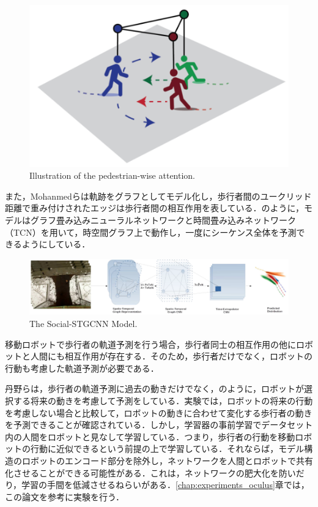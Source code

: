 \begin{figure}[hbtp]
     \centering
    \includegraphics[keepaspectratio, scale=0.4]
         {images/s-bigat.png}
    \caption{Illustration of the pedestrian-wise attention.\protect\footnotemark[3]}
    \label{Fig:s-bigat}
\end{figure}

\protect{}

また，Mohanmedら\cite{s-stgcnn}は軌跡をグラフとしてモデル化し，歩行者間のユークリッド距離で重み付けされたエッジは歩行者間の相互作用を表している．のように，モデルはグラフ畳み込みニューラルネットワークと時間畳み込みネットワーク（TCN）を用いて，時空間グラフ上で動作し，一度にシーケンス全体を予測できるようにしている．

\begin{figure}[hbtp]
     \centering
    \includegraphics[keepaspectratio, scale=0.39]
         {images/s-stgcnn.png}
    \caption{The Social-STGCNN Model.\protect\footnotemark[4]}
    \label{Fig:s-stgcnn}
\end{figure}

\protect{}

\newpage

移動ロボットで歩行者の軌道予測を行う場合，歩行者同士の相互作用の他にロボットと人間にも相互作用が存在する．そのため，歩行者だけでなく，ロボットの行動も考慮した軌道予測が必要である．

丹野ら\cite{si2023-tanno}は，歩行者の軌道予測に過去の動きだけでなく，のように，ロボットが選択する将来の動きを考慮して予測をしている．実験では，ロボットの将来の行動を考慮しない場合と比較して，ロボットの動きに合わせて変化する歩行者の動きを予測できることが確認されている．しかし，学習器の事前学習でデータセット内の人間をロボットと見なして学習している．つまり，歩行者の行動を移動ロボットの行動に近似できるという前提の上で学習している．それならば，モデル構造のロボットのエンコード部分を除外し，ネットワークを人間とロボットで共有化させることができる可能性がある．これは，ネットワークの肥大化を防いだり，学習の手間を低減させるねらいがある．\ref{chap:experiments_oculus}章では，この論文を参考に実験を行う．

